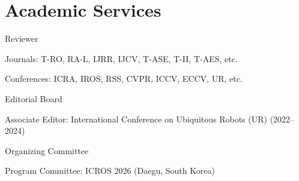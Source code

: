 \section{Academic Services}

\begin{pubSubsection}{Reviewer}
    \item Journals: T-RO, RA-L, IJRR, IJCV, T-ASE, T-II, T-AES, etc.
    \vspace{-1mm}
    \item Conferences: ICRA, IROS, RSS, CVPR, ICCV, ECCV, UR, etc.
\end{pubSubsection}

\vspace{-2mm}
\begin{pubSubsectionNum}{Editorial Board}
    \item Associate Editor: International Conference on Ubiquitous Robots (UR) (2022--2024)
\end{pubSubsectionNum}

\vspace{-2mm}
\begin{pubSubsectionNum}{Organizing Committee}
    \item Program Committee: ICROS 2026 (Daegu, South Korea)
\end{pubSubsectionNum}
